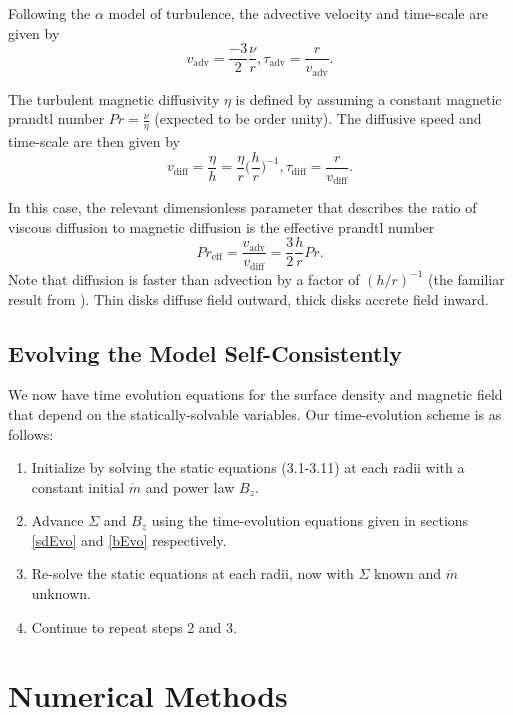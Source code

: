 Following the $\alpha$ model of turbulence, the advective velocity and time-scale are given by 
\begin{equation}
v_{\text{adv}}=\frac{-3}{2} \frac{\nu}{r}, \tau_{\text{adv}}=\frac{r}{v_{\text{adv}}}. 
\end{equation}
 
The turbulent magnetic diffusivity $\eta$ is defined by assuming a constant magnetic prandtl number $Pr=\frac{\nu}{\eta}$ (expected to be order unity).  The diffusive speed and time-scale are then given by   
\begin{equation}
v_{\text{diff}}=\frac{\eta}{h} = \frac{\eta}{r} \Big(\frac{h}{r}\Big)^{-1}, \tau_{\text{diff}}=\frac{r}{v_{\text{diff}}}. 
\end{equation}

In this case, the relevant dimensionless parameter that describes the ratio of viscous diffusion to magnetic diffusion is the effective prandtl number 
\begin{equation}
Pr_{\text{eff}} = \frac{v_{\text{adv}}}{v_{\text{diff}}} = \frac{3}{2} \frac{h}{r}Pr.
\end{equation} 
Note that diffusion is faster than advection by a factor of $(h/r)^{-1}$ (the familiar result from \cite{lubow93}).  Thin disks diffuse field outward, thick disks accrete field inward.


\subsection{Evolving the Model Self-Consistently}
We now have time evolution equations for the surface density and magnetic field that depend on the statically-solvable variables. 
Our time-evolution scheme is as follows:
\begin{enumerate}
\item{Initialize by solving the static equations (3.1-3.11) at each radii with a constant initial $\dot{m}$ and power law $B_z$.  }
\item{Advance $\Sigma$ and $B_z$ using the time-evolution equations given in sections \ref{sdEvo} and \ref{bEvo} respectively. }
\item{Re-solve the static equations at each radii, now with $\Sigma$ known and $\dot{m}$ unknown.}
\item{Continue to repeat steps 2 and 3.}
\end{enumerate}





\section{Numerical Methods}


